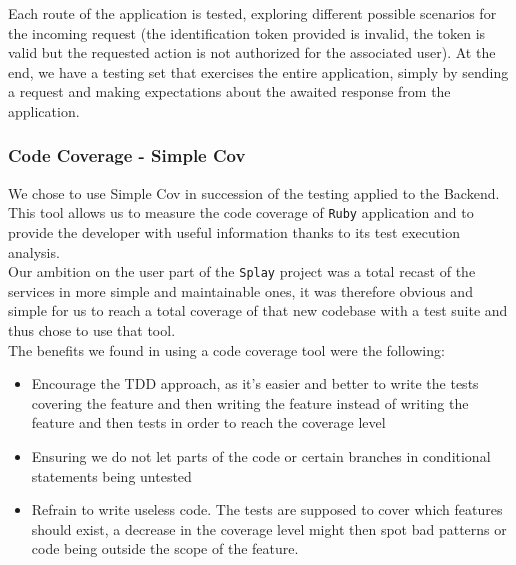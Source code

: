 \documentclass{eplmastersthesis}
\begin{document}
          Each route of the application is tested, exploring different possible
          scenarios for the incoming request (the identification token provided
          is invalid, the token is valid but the requested action is not
          authorized for the associated user). At the end, we have a testing set
          that exercises the entire application, simply by sending a request and
          making expectations about the awaited response from the application.

        \subsubsection{Code Coverage - Simple Cov}

          We chose to use Simple Cov in succession of the testing applied to
          the Backend. This tool allows us to measure the code coverage of \texttt{Ruby}
          application and to provide the developer with useful information
          thanks to its test execution analysis.\\

          Our ambition on the user part of the \texttt{Splay} project was a total recast of
          the services in more simple and maintainable ones, it was therefore
          obvious and simple for us to reach a total coverage of that new codebase
          with a test suite and thus chose to use that tool.\\

          The benefits we found in using a code coverage tool were the
          following:

          \begin{itemize}
            \item Encourage the TDD approach, as it's easier and better to
            write the tests covering the feature and then writing the feature
            instead of writing the feature and then tests in order to reach
            the coverage level
            \item Ensuring we do not let parts of the code or certain branches
            in conditional statements being untested
            \item Refrain to write useless code. The tests are supposed to cover
            which features should exist, a decrease in the coverage level
            might then spot bad patterns or code being outside the scope
            of the feature.
          \end{itemize}
\end{document}
